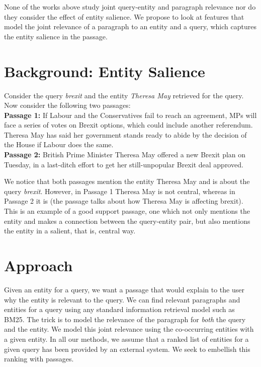 \documentclass[sigconf,anonymous,review]{acmart}
\newcommand{\todo}[1]{ \PackageWarning{TODO:}{#1!}}
\begin{document}
None of the works above study joint query-entity and paragraph relevance nor do they consider the effect of entity salience. We propose to look at features that model the joint relevance of a paragraph to an entity and a query, which captures the entity salience in the passage. 

\section{Background: Entity Salience}
\label{sec: entity salience}
Consider the query \textit{brexit} and the entity \textit{Theresa May} retrieved for the query. Now consider the following two passages: \\
\textbf{Passage 1: }  If Labour and the Conservatives fail to reach an agreement, MPs will face a series of votes on Brexit options, which could include another referendum. Theresa May has said her government stands ready to abide by the decision of the House  if Labour does the same.\\
\textbf{Passage 2: } British Prime Minister Theresa May offered a new Brexit plan on Tuesday, in a last-ditch effort to get her still-unpopular Brexit deal approved.

We notice that both passages mention the entity Theresa May and is about the query \textit{brexit}.
However, in Passage 1 Theresa May is not central, whereas in Passage 2 it is (the passage talks about how Theresa May is affecting brexit).  This is an example of a good support passage, one which not only mentions the entity and makes a connection between the query-entity pair, but also mentions the entity in a salient, that is, central way. 




\section{Approach}
\label{sec:approach}
Given an entity for a query, we want a passage that would explain to the user why the entity is relevant to the query. We can find relevant paragraphs and entities for a query using any standard information retrieval model such as BM25. The trick is to model the relevance of the paragraph for \textit{both} the query and the entity. We model this joint relevance using the co-occurring entities with a given entity. 
In all our methods, we assume that a ranked list of entities for a given query has been provided by an external system. We seek to embellish this ranking with passages. 
\end{document}
